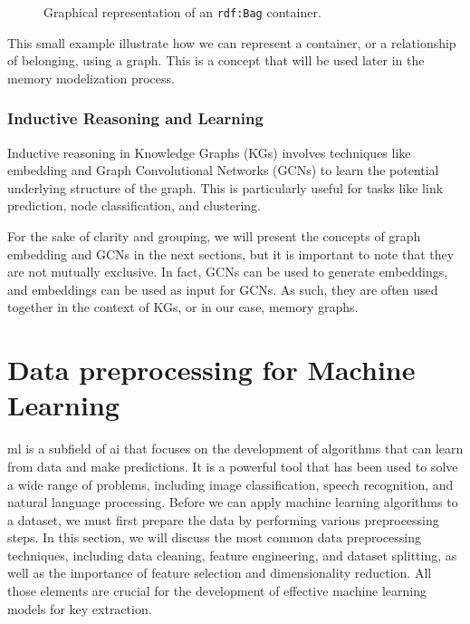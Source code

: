     \begin{figure}[H]
        \centering
        \caption{Graphical representation of an \texttt{rdf:Bag} container.}
    \end{figure}

    This small example illustrate how we can represent a container, or a relationship of belonging, using a graph. This is a concept that will be used later in the memory modelization process.

    \subsubsection{Inductive Reasoning and Learning}
    Inductive reasoning in Knowledge Graphs (KGs) involves techniques like embedding and Graph Convolutional Networks (GCNs) to learn the potential underlying structure of the graph. This is particularly useful for tasks like link prediction, node classification, and clustering.

    For the sake of clarity and grouping, we will present the concepts of graph embedding and GCNs in the next sections, but it is important to note that they are not mutually exclusive. In fact, GCNs can be used to generate embeddings, and embeddings can be used as input for GCNs. As such, they are often used together in the context of KGs, or in our case, memory graphs.

\section{Data preprocessing for Machine Learning}\label{sec:background:processing}
    \acrfull{ml} is a subfield of \acrfull{ai} that focuses on the development of algorithms that can learn from data and make predictions. It is a powerful tool that has been used to solve a wide range of problems, including image classification, speech recognition, and natural language processing. Before we can apply machine learning algorithms to a dataset, we must first prepare the data by performing various preprocessing steps. In this section, we will discuss the most common data preprocessing techniques, including data cleaning, feature engineering, and dataset splitting, as well as the importance of feature selection and dimensionality reduction. All those elements are crucial for the development of effective machine learning models for key extraction.

